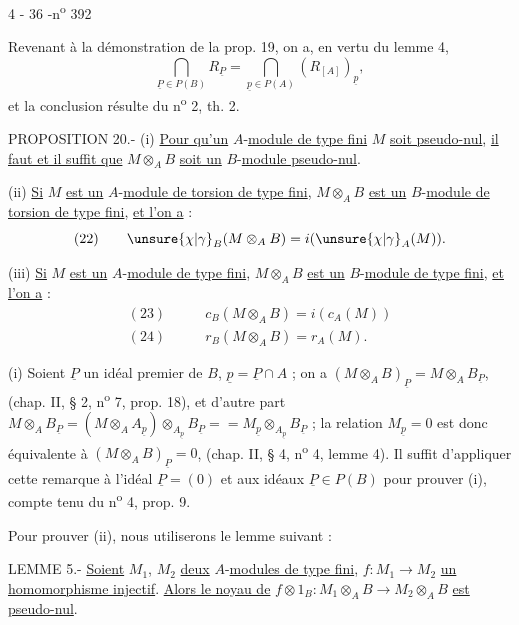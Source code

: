\begin{center}4 - 36 -\hfill n\textsuperscript{o} 392\end{center}

Revenant à la démonstration de la prop. 19, on a, en vertu du lemme 4,
\[
\bigcap_{\underline{P}\in P(B)}R_{\underline{P}}=\bigcap_{\underline{p}\in P(A)}(R_{[A]})_{\underline{p}},
\]
et la conclusion résulte du n\textsuperscript{o} 2, th. 2.

PROPOSITION 20.- (i) \uline{Pour qu'un} $A$-\uline{module de type fini} $M$ \uline{soit pseudo-nul}, \uline{il faut et il suffit que} $M\otimes_A B$ \uline{soit un} $B$-\uline{module pseudo-nul}.

(ii) \uline{Si} $M$ \uline{est un} $A$-\uline{module de torsion de type fini}, $M\otimes_A B$ \uline{est un} $B$-\uline{module de torsion de type fini}, \uline{et l'on a} :
\[
(22)\qquad\unsure{\chi|\gamma}_B(M\otimes_A B)=i(\unsure{\chi|\gamma}_A(M)).
\]

(iii) \uline{Si} $M$ \uline{est un} $A$-\uline{module de type fini}, $M\otimes_A B$ \uline{est un} $B$-\uline{module de type fini}, \uline{et l'on a} :
\[
\begin{aligned}
(23)\qquad &c_B(M\otimes_A B)=i(c_A(M))\\
(24)\qquad &r_B(M\otimes_A B)=r_A(M).
\end{aligned}
\]

(i) Soient $\underline{P}$ un idéal premier de $B$, $\underline{p}=\underline{P}\cap A$ ; on a $(M\otimes_A B)_{\underline{P}}=M\otimes_A B_{\underline{P}}$, (chap. II, § 2, n\textsuperscript{o} 7, prop. 18), et d'autre part $M\otimes_A B_{\underline{P}}=(M\otimes_A A_{\underline{p}})\otimes_{A_{\underline{p}}}B_{\underline{P}}= {}=M_{\underline{p}}\otimes_{A_{\underline{p}}}B_{\underline{P}}$ ; la relation $M_{\underline{p}}=0$ est donc équivalente à $(M\otimes_A B)_{\underline{P}}=0$, (chap. II, § 4, n\textsuperscript{o} 4, lemme 4). Il suffit d'appliquer cette remarque à l'idéal $\underline{P}=(0)$ et aux idéaux $\underline{P}\in P(B)$ pour prouver (i), compte tenu du n\textsuperscript{o} 4, prop. 9.

Pour prouver (ii), nous utiliserons le lemme suivant :

LEMME 5.- \uline{Soient} $M_1$, $M_2$ \uline{deux} $A$-\uline{modules de type fini}, $f:M_1\longrightarrow M_2$ \uline{un homomorphisme injectif}. \uline{Alors le noyau de} $f\otimes1_B:M_1\otimes_A B\longrightarrow M_2\otimes_A B$ \uline{est pseudo-nul}.

